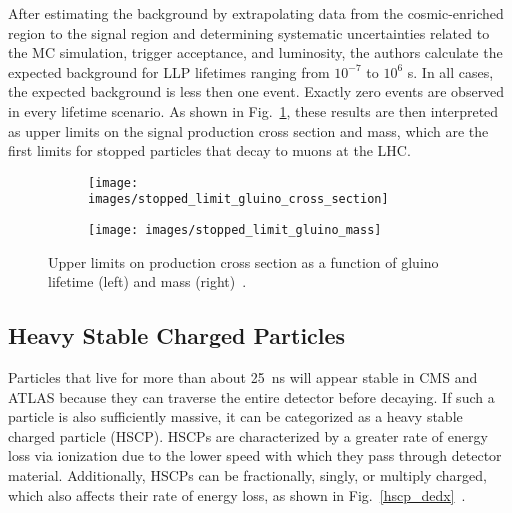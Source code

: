 \documentclass[12pt]{article}
\begin{document}
        After estimating the background by extrapolating data from the cosmic-enriched region to the signal region and determining systematic uncertainties related to the MC simulation, trigger acceptance, and luminosity, the authors calculate the expected background for LLP lifetimes ranging from $10^{-7}$ to $10^6$ s. In all cases, the expected background is less then one event. Exactly zero events are observed in every lifetime scenario. As shown in Fig.~\ref{stopped_limits}, these results are then interpreted as upper limits on the signal production cross section and mass, which are the first limits for stopped particles that decay to muons at the LHC.

        \noindent \begin{figure}[htbp] \begin{center}
        \begin{subfigure}[htbp]{0.5\textwidth} \begin{center}
        \texttt{[image: images/stopped\_limit\_gluino\_cross\_section]}
        \end{center} \end{subfigure}
        \begin{subfigure}[htbp]{0.45\textwidth} \begin{center}
        \texttt{[image: images/stopped\_limit\_gluino\_mass]}
        \end{center} \end{subfigure}
        \caption{Upper limits on production cross section as a function of gluino lifetime (left) and mass (right)~\cite{cms_stopped}.}
        \label{stopped_limits}
        \end{center} \end{figure}

    \subsection{Heavy Stable Charged Particles}
        Particles that live for more than about \SI{25}{\nano\s} will appear stable in CMS and ATLAS because they can traverse the entire detector before decaying. If such a particle is also sufficiently massive, it can be categorized as a heavy stable charged particle (HSCP). HSCPs are characterized by a greater rate of energy loss via ionization due to the lower speed with which they pass through detector material. Additionally, HSCPs can be fractionally, singly, or multiply charged, which also affects their rate of energy loss, as shown in Fig.~\ref{hscp_dedx}~\cite{cms_hscp}.
\end{document}
